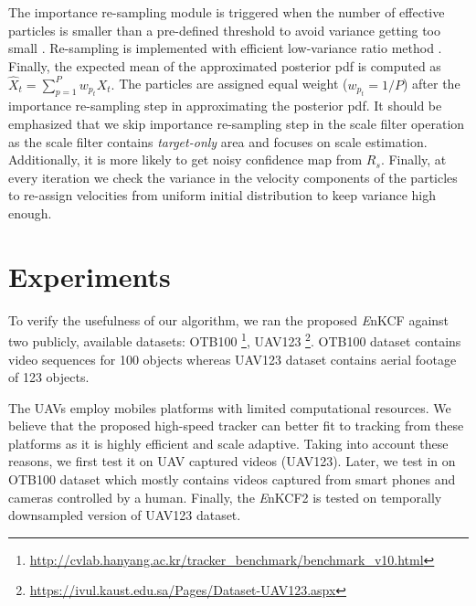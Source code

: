 \documentclass{bmvc2k}
\begin{document}
The importance re-sampling module is triggered when the number of
effective particles is smaller than a pre-defined threshold to avoid
variance getting too small \cite{thrun2005probabilistic}. Re-sampling
is implemented with efficient low-variance ratio method
\cite{thrun2005probabilistic}. Finally, the expected mean of the
approximated posterior pdf is computed as $\hat{X}_{t} = \sum_{p=1}^{P}w_{p_{t}} X_{t}.$
The particles are assigned equal weight ($w_{p_{t}}=1/P$) after the importance
re-sampling step in approximating the posterior pdf. It should be
emphasized that we skip importance re-sampling step in the scale
filter operation as the scale filter contains \textit{target-only}
area and focuses on scale estimation. Additionally, it is
more likely to get noisy confidence map from $R_{s}$. Finally, at
every iteration we check the variance in the velocity components of
the particles to re-assign velocities from uniform initial
distribution to keep variance high enough.

\section{Experiments} \label{sc:Experiments}
To verify the usefulness of our algorithm, we ran the proposed
{\it E}nKCF against two publicly, available datasets:
OTB100 \footnote{\url{http://cvlab.hanyang.ac.kr/tracker_benchmark/benchmark_v10.html}},
UAV123 \footnote{\url{https://ivul.kaust.edu.sa/Pages/Dataset-UAV123.aspx}}\cite{mueller2016uav123}. 
OTB100 dataset contains video sequences for 100 objects whereas UAV123 dataset contains aerial footage of 123 objects. 

The UAVs employ mobiles platforms with limited computational resources. We
believe that the proposed high-speed tracker can better fit to tracking from
these platforms as it is highly efficient and scale adaptive. Taking into account these reasons, we first test it on UAV captured videos (UAV123). Later, we test in on OTB100 dataset which mostly contains videos captured from smart phones and cameras controlled by a human. Finally, the {\it E}nKCF2 is tested on temporally downsampled version of UAV123 dataset.
\end{document}
